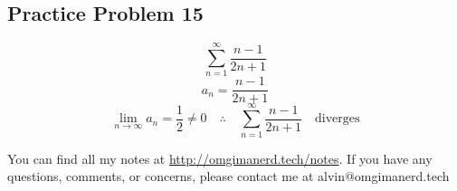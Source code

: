 \documentclass[letterpaper, 12pt]{math}
\begin{document}
\subsection*{Practice Problem 15}
\[ \sum_{n=1}^{\infty}\frac{n-1}{2n+1} \]
\[ a_{n} = \frac{n-1}{2n+1} \]
\[ \lim_{n\to\infty}a_{n} = \frac{1}{2} \neq 0 \quad \therefore \quad
   \sum_{n=1}^{\infty}\frac{n-1}{2n+1} \quad \mathrm{diverges} \]

\begin{center}
  You can find all my notes at \url{http://omgimanerd.tech/notes}. If you have
  any questions, comments, or concerns, please contact me at
  alvin@omgimanerd.tech
\end{center}
\end{document}
